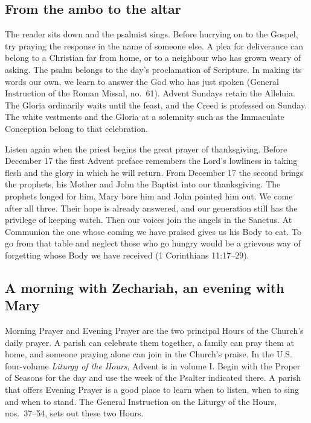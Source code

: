 \subsection{From the ambo to the altar}

The reader sits down and the psalmist sings. Before hurrying on to the Gospel, try praying the response in the name of someone else. A plea for deliverance can belong to a Christian far from home, or to a neighbour who has grown weary of asking. The psalm belongs to the day's proclamation of Scripture. In making its words our own, we learn to answer the God who has just spoken (General Instruction of the Roman Missal, no.~61). Advent Sundays retain the Alleluia. The Gloria ordinarily waits until the feast, and the Creed is professed on Sunday. The white vestments and the Gloria at a solemnity such as the Immaculate Conception belong to that celebration.

Listen again when the priest begins the great prayer of thanksgiving. Before December 17 the first Advent preface remembers the Lord's lowliness in taking flesh and the glory in which he will return. From December 17 the second brings the prophets, his Mother and John the Baptist into our thanksgiving. The prophets longed for him, Mary bore him and John pointed him out. We come after all three. Their hope is already answered, and our generation still has the privilege of keeping watch. Then our voices join the angels in the Sanctus. At Communion the one whose coming we have praised gives us his Body to eat. To go from that table and neglect those who go hungry would be a grievous way of forgetting whose Body we have received (1 Corinthians 11:17--29).

\subsection{A morning with Zechariah, an evening with Mary}

Morning Prayer and Evening Prayer are the two principal Hours of the Church's daily prayer. A parish can celebrate them together, a family can pray them at home, and someone praying alone can join in the Church's praise. In the U.S. four-volume \emph{Liturgy of the Hours}, Advent is in volume I. Begin with the Proper of Seasons for the day and use the week of the Psalter indicated there. A parish that offers Evening Prayer is a good place to learn when to listen, when to sing and when to stand. The General Instruction on the Liturgy of the Hours, nos.~37--54, sets out these two Hours.

